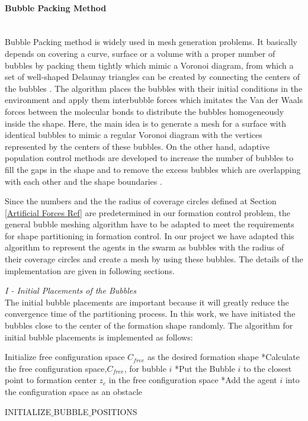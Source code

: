 \paragraph{Bubble Packing Method} \hspace{0pt} \\				
Bubble Packing method is widely used in mesh generation problems. It basically depends on covering a curve, surface or a volume with a proper number of bubbles by packing them tightly which mimic a Voronoi diagram, from which a set of well-shaped Delaunay triangles can be created by connecting the centers of the bubbles \cite{27}.  The algorithm places the bubbles with their initial conditions in the environment and apply them interbubble forces which imitates the Van der Waals forces between the molecular bonds  to distribute the bubbles homogeneously inside the shape. Here, the main idea is to generate a mesh for a surface with identical bubbles to mimic a regular Voronoi diagram with the vertices represented by the centers of these bubbles. On the other hand, adaptive population control  methods are developed to increase the number of bubbles to fill the gaps in the shape and to remove the excess bubbles which are overlapping with each other and the shape boundaries \cite{27}. 

Since the numbers and the the radius of coverage circles defined at Section \ref{Artificial Forces Ref} are predetermined in our formation control problem, the general bubble meshing algorithm have to be adapted to meet the requirements for shape partitioning in formation control.  In our project we have adapted this algorithm to represent the agents in the swarm as bubbles with the radius of their coverage circles and create a mesh by using these bubbles. The details of the implementation are given in following sections.\newline
			
\textit{			I - Initial Placements of the Bubbles} \\ 
The initial bubble placements are important because it will greatly reduce the convergence time of the partitioning process. In this work, we have initiated the bubbles close to the center of the formation shape randomly. The algorithm for initial bubble placements is implemented as follows: \newline
			
\begin{algorithm}[H]
Initialize free configuration space $C_{free}$ as the desired formation shape \newline
{}
{		
*Calculate the free configuration space,$C_{free}$, for bubble $i$\;
*Put the Bubble $i$ to the closest point to  formation center  $z_c$  in the free configuration space\;
*Add the agent $i$ into the configuration space as an obstacle \;
}\		
\caption{INITIALIZE$\_$BUBBLE$\_$POSITIONS} \label{intial_buble}
\end{algorithm}
		
